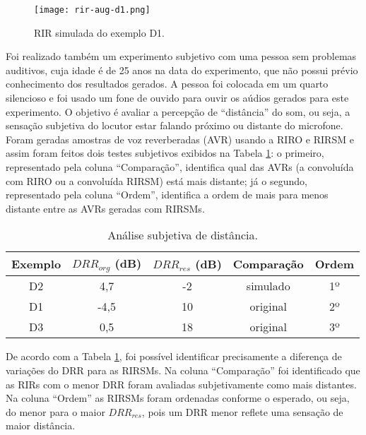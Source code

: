 \begin{figure} [H]
    \centering
    \texttt{[image: rir-aug-d1.png]}
    \caption{RIR simulada do exemplo D1.}
    \label{fig:rir-aug-d1}
\end{figure} 

Foi realizado também um experimento subjetivo com uma pessoa sem problemas auditivos, cuja idade é de 25 anos na data do experimento,  
que não possui prévio conhecimento dos resultados gerados.
A pessoa foi colocada em um quarto silencioso e foi usado um fone de ouvido para ouvir os aúdios gerados para este experimento.
O objetivo é avaliar a percepção de “distância” do som, ou seja, a sensação subjetiva do locutor estar falando próximo ou distante
do microfone.
Foram geradas amostras de voz reverberadas (AVR) usando a RIRO e RIRSM e assim foram feitos dois testes subjetivos exibidos na Tabela \ref{tbl:drr-exp}:
o primeiro, representado pela coluna “Comparação”, identifica qual das AVRs (a convoluída com RIRO ou a convoluída RIRSM) está mais distante;
já o segundo, representado pela coluna “Ordem”, identifica a ordem de mais para menos distante entre as AVRs geradas com RIRSMs.

\begin{table} [H]
    \centering
    \caption{Análise subjetiva de distância.}
    \label{tbl:drr-exp}
    \begin{tabular}{c|c|c|c|c}

        \textbf{Exemplo} & 
        \textbf{$DRR_{org}$ (dB)} & 
        \textbf{$DRR_{res}$ (dB)} & 
        \textbf{Comparação} &
        \textbf{Ordem} \\
        \hline 

        D2 & 4,7 & -2 & simulado & 1º \\
        D1 & -4,5 & 10 & original & 2º \\
        D3 & 0,5 & 18 & original & 3º \\

    \end{tabular}
\end{table}

De acordo com a Tabela \ref{tbl:drr-exp}, foi possível identificar precisamente a diferença de variações do DRR para as RIRSMs.
Na coluna ``Comparação'' foi identificado que as RIRs com o menor DRR foram avaliadas subjetivamente como mais distantes.
Na coluna ``Ordem'' as RIRSMs foram ordenadas conforme o esperado, ou seja, do menor para o maior $DRR_{res}$, pois um DRR menor reflete uma sensação
de maior distância.


